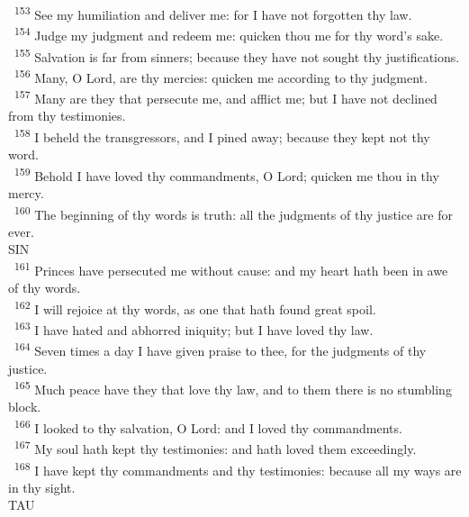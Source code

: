\documentclass[a5paper,12pt]{article}
\begin{document}
\begin{multicols*}{2}
~\textsuperscript{153} See my humiliation and deliver me: for I have not forgotten thy law.\\
~\textsuperscript{154} Judge my judgment and redeem me: quicken thou me for thy word's sake.\\
~\textsuperscript{155} Salvation is far from sinners; because they have not sought thy justifications.\\
~\textsuperscript{156} Many, O Lord, are thy mercies: quicken me according to thy judgment.\\
~\textsuperscript{157} Many are they that persecute me, and afflict me; but I have not declined from thy testimonies.\\
~\textsuperscript{158} I beheld the transgressors, and I pined away; because they kept not thy word.\\
~\textsuperscript{159} Behold I have loved thy commandments, O Lord; quicken me thou in thy mercy.\\
~\textsuperscript{160} The beginning of thy words is truth: all the judgments of thy justice are for ever.\\

SIN\\

~\textsuperscript{161} Princes have persecuted me without cause: and my heart hath been in awe of thy words.\\
~\textsuperscript{162} I will rejoice at thy words, as one that hath found great spoil.\\
~\textsuperscript{163} I have hated and abhorred iniquity; but I have loved thy law.\\
~\textsuperscript{164} Seven times a day I have given praise to thee, for the judgments of thy justice.\\
~\textsuperscript{165} Much peace have they that love thy law, and to them there is no stumbling block.\\
~\textsuperscript{166} I looked to thy salvation, O Lord: and I loved thy commandments.\\
~\textsuperscript{167} My soul hath kept thy testimonies: and hath loved them exceedingly.\\
~\textsuperscript{168} I have kept thy commandments and thy testimonies: because all my ways are in thy sight.\\

TAU\\


\end{multicols*}
\end{document}

